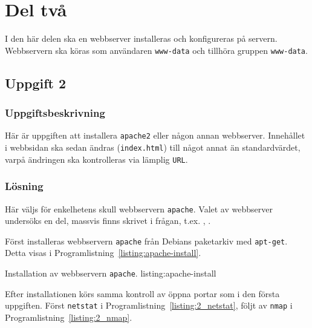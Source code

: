 %
%
%


\section{Del två}
I den här delen ska en webbserver installeras och konfigureras på servern.
Webbservern ska köras som användaren \texttt{www-data} och tillhöra gruppen
\texttt{www-data}.


\subsection{Uppgift 2}
\subsubsection{Uppgiftsbeskrivning}
Här är uppgiften att installera \texttt{apache2} eller någon annan webbserver.
Innehållet i webbsidan ska sedan ändras (\texttt{index.html}) till något annat
än standardvärdet, varpå ändringen ska kontrolleras via lämplig \texttt{URL}.


\subsubsection{Lösning}
Här väljs för enkelhetens skull webbservern \texttt{apache}. 
Valet av webbserver undersöks en del, massvis finns skrivet i frågan, t.ex.
\cite{webserver:compar1}, \cite{webserver:compar2}.

Först installeras webbservern \texttt{apache} från Debians paketarkiv med
\texttt{apt-get}. 
Detta visas i Programlistning~\ref{listing:apache-install}.

            {Installation av webbservern \texttt{apache}.}
            {listing:apache-install}

Efter installationen körs samma kontroll av öppna portar som i den första
uppgiften.  Först \texttt{netstat} i Programlistning~\ref{listing:2_netstat},
följt av \texttt{nmap} i Programlistning~\ref{listing:2_nmap}.


